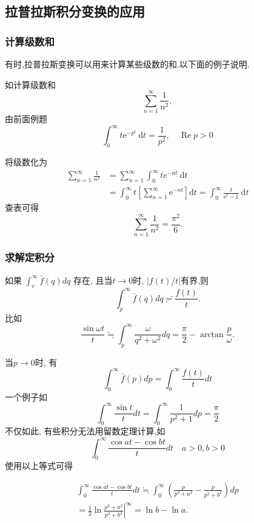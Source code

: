 \subsection{拉普拉斯积分变换的应用}
\label{subsec:applications}

\subsubsection{计算级数和}
有时,拉普拉斯变换可以用来计算某些级数的和.以下面的例子说明.

如计算级数和
$$
    \sum_{n=1} ^{\infty}  \frac{1}{n^2},
$$
由前面例题
$$
\int_0^{\infty} t \mathrm{e}^{-p^t} \mathrm{~d} t=\frac{1}{p^2}, \quad \operatorname{Re} p>0
$$

将级数化为
$$
\begin{aligned}
\sum_{n= 1}^{\infty} \frac{1}{n^2} & =\sum_{n=1}^{\infty} \int_0^{\infty} t e^{-n t} \mathrm{~d} t \\
& =\int_0^{\infty} t\left[\sum_{n=1}^{\infty} \mathrm{e}^{-n t}\right] \mathrm{d} t=\int_0^{\infty} \frac{t}{\mathrm{e}^t-1} \mathrm{~d} t
\end{aligned}
$$
查表可得
\begin{equation}
    \sum_{n=1} ^{\infty}  \frac{1}{n^2} = \frac{\pi^2}{6}.
\end{equation}

\subsubsection{求解定积分}
如果 $\int_v^{\infty} \bar{f}(q) d q$ 存在, 且当$t\to 0$时, $|f(t)/t|$有界,则
\begin{equation}
    \int_{p}^{\infty} \bar{f}(q) dq \risingdotseq \frac{f(t)}{t} . 
\end{equation}
比如
$$
\frac{\sin \omega t}{t} \fallingdotseq \int_p^{\infty} \frac{\omega}{q^2+\omega^2} d q=\frac{\pi}{2}-\arctan \frac{p}{\omega}.
$$

当$p\to 0$时, 有
\begin{equation}
    \int_0^{\infty} \bar{f}(p) d p=\int_0^{\infty} \frac{f(t)}{t} d t
\end{equation}
一个例子如
$$
\int_0^{\infty} \frac{\sin t}{t} d t=\int_0^{\infty} \frac{1}{p^2+1} d p=\frac{\pi}{2}
$$
不仅如此, 有些积分无法用留数定理计算,如
$$
\int_0^{\infty} \frac{\cos a t-\cos b t}{t} d t \quad a>0, b>0
$$
使用以上等式可得

$$
\begin{gathered}
\int_0^{\infty} \frac{\cos a t-\cos b t}{t} d t \fallingdotseq \int_0^{\infty}\left(\frac{p}{p^2+a^2}-\frac{p}{p^2+b^2}\right) d p \\
=\left.\frac{1}{2} \ln \frac{p^2+a^2}{p^2+b^2}\right|^{\infty}=\ln b-\ln a .
\end{gathered}
$$

